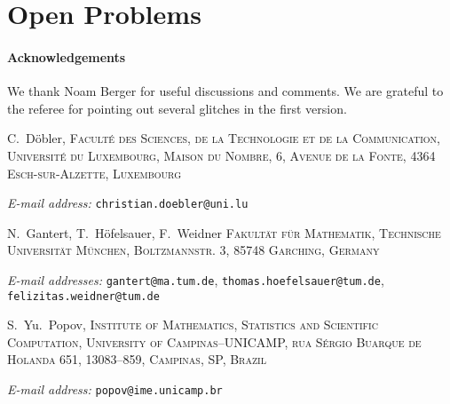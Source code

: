 \documentclass[12pt,a4paper]{article}
\makeatletter
\theoremstyle{plain}
\newcommand{\1}{\mathds{1}} %
\newcommand{\Addresses}{{%
  \bigskip
  \footnotesize

   C.~Döbler, \textsc{Faculté des Sciences, de la Technologie et de la Communication, Université du Luxembourg, %
   Maison du Nombre, 6, Avenue de la Fonte, 4364 Esch-sur-Alzette, Luxembourg}\par\nopagebreak
  \textit{E-mail address:} \texttt{christian.doebler@uni.lu}
  
  \medskip
  
  N.~Gantert, T.~Höfelsauer, F.~Weidner \textsc{Fakultät für Mathematik, Technische Universität München, %
  Boltzmannstr. 3, 85748 Garching, Germany}\par\nopagebreak
  \textit{E-mail addresses:} \texttt{gantert@ma.tum.de}, \texttt{thomas.hoefelsauer@tum.de}, \newline \texttt{felizitas.weidner@tum.de}

  \medskip

  S.~Yu.~Popov, \textsc{Institute of Mathematics, Statistics and Scientific Computation, University of Campinas--UNICAMP, %
  rua Sérgio Buarque de Holanda 651, 13083--859, Campinas, SP, Brazil}\par\nopagebreak
  \textit{E-mail address:} \texttt{popov@ime.unicamp.br}

}}
\makeatother
\begin{document}



\section{Open Problems}\label{open_problems}


\paragraph{Acknowledgements} We thank Noam Berger for useful discussions and comments. We are grateful to the referee for pointing out several glitches in the first version.







\Addresses
\end{document}
